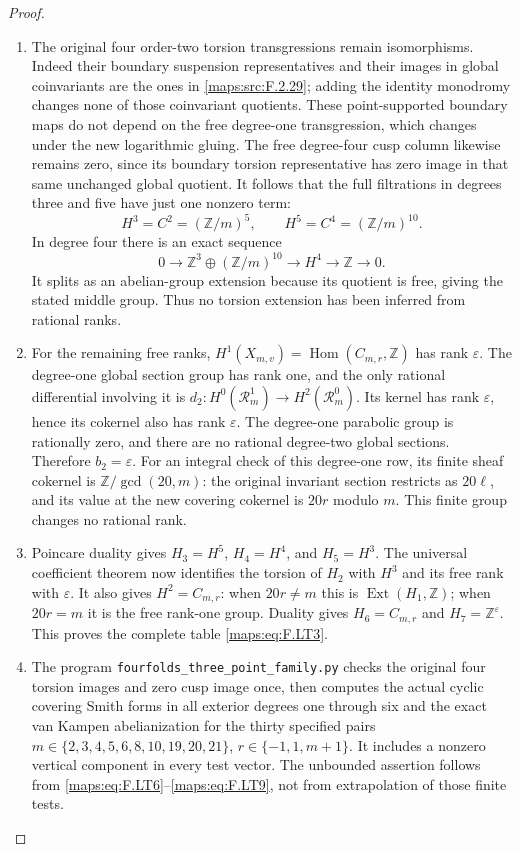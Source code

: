 \documentclass[11pt,a4paper]{article}
\theoremstyle{definition}
\begin{document}
\begin{proof}
\begin{enumerate}[label=\arabic*.]
\item The original four order-two torsion transgressions
remain isomorphisms.
Indeed their boundary suspension representatives and
their images in global coinvariants are the ones in
\ref{maps:src:F.2.29}; adding the identity monodromy changes none
of those coinvariant quotients.
These point-supported boundary maps do not depend
on the free degree-one transgression, which changes
under the new logarithmic gluing.
The free degree-four cusp column likewise remains
zero, since its boundary torsion representative has
zero image in that same unchanged global quotient.
It follows that the full filtrations in degrees
three and five have just one nonzero term:
\[
 H^3=C^2=(\mathbb Z/m)^5,\qquad
 H^5=C^4=(\mathbb Z/m)^{10}.
\tag{F.LT9}\label{maps:eq:F.LT9}
\]
In degree four there is an exact sequence
\[
 0\longrightarrow
       \mathbb Z^3\oplus(\mathbb Z/m)^{10}
  \longrightarrow H^4
  \longrightarrow\mathbb Z\longrightarrow0.
\]
It splits as an abelian-group extension because
its quotient is free, giving the stated middle group.
Thus no torsion extension has been inferred from
rational ranks.

\item For the remaining free ranks,
$H^1(X_{m,v})=\operatorname{Hom}(C_{m,r},\mathbb Z)$
has rank $\varepsilon$.
The degree-one global section group has rank one,
and the only rational differential involving it is
$d_2:H^0(\mathcal R_m^1)\to H^2(\mathcal R_m^0)$.
Its kernel has rank $\varepsilon$, hence its
cokernel also has rank $\varepsilon$.
The degree-one parabolic group is rationally zero,
and there are no rational degree-two global sections.
Therefore $b_2=\varepsilon$.
For an integral check of this degree-one row, its
finite sheaf cokernel is
$\mathbb Z/\gcd(20,m)$: the original invariant
section restricts as $20\ell$, and its value at
the new covering cokernel is $20r$ modulo $m$.
This finite group changes no rational rank.

\item Poincare duality gives
$H_3=H^5$, $H_4=H^4$, and $H_5=H^3$.
The universal coefficient theorem now identifies
the torsion of $H_2$ with $H^3$ and its free rank
with $\varepsilon$.
It also gives $H^2=C_{m,r}$: when $20r\ne m$ this
is $\operatorname{Ext}(H_1,\mathbb Z)$; when
$20r=m$ it is the free rank-one group.
Duality gives $H_6=C_{m,r}$ and
$H_7=\mathbb Z^\varepsilon$.
This proves the complete table \eqref{maps:eq:F.LT3}.

\item The program \texttt{fourfolds\_three\_point\_family.py}
checks the original four torsion images and zero
cusp image once, then computes the actual cyclic
covering Smith forms in all exterior degrees one
through six and the exact van Kampen abelianization
for the thirty specified pairs
$m\in\{2,3,4,5,6,8,10,19,20,21\}$,
$r\in\{-1,1,m+1\}$.
It includes a nonzero vertical component in every
test vector.
The unbounded assertion follows from \eqref{maps:eq:F.LT6}--\eqref{maps:eq:F.LT9},
not from extrapolation of those finite tests.

\end{enumerate}
\end{proof}
\end{document}
